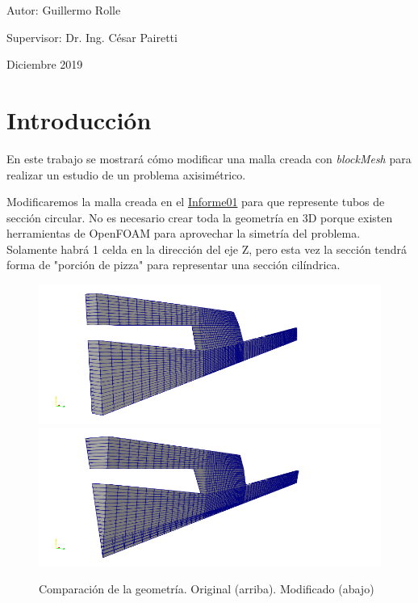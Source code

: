 \documentclass{article}
\begin{document}
\begin{titlepage}
\begin{center}
    \bigskip
    \vspace*{\fill}
    Autor: Guillermo Rolle\par
    Supervisor: Dr. Ing. César Pairetti\par
    \bigskip
    Diciembre 2019
\end{center}
\end{titlepage}

\tableofcontents
\newpage

\section{Introducción}
En este trabajo se mostrará cómo modificar una malla creada con \textit{blockMesh} para realizar un estudio de un problema axisimétrico.\par
Modificaremos la malla creada en el \href{https://github.com/guillerolle/informes_cfd/blob/master/Informe01.pdf}{Informe01} para que represente tubos de sección circular. No es necesario crear toda la geometría en 3D porque existen herramientas de OpenFOAM para aprovechar la simetría del problema. Solamente habrá 1 celda en la dirección del eje Z, pero esta vez la sección tendrá forma de "porción de pizza" para representar una sección cilíndrica.

\begin{figure}[h!]
	\centering
	\includegraphics[width=1\textwidth]{Figuras/01_comp_01.png}
	\includegraphics[width=1\textwidth]{Figuras/01_comp_02.png}
	\caption{Comparación de la geometría. Original (arriba). Modificado (abajo)}
	\label{fig:preliminar}
\end{figure}
\end{document}
